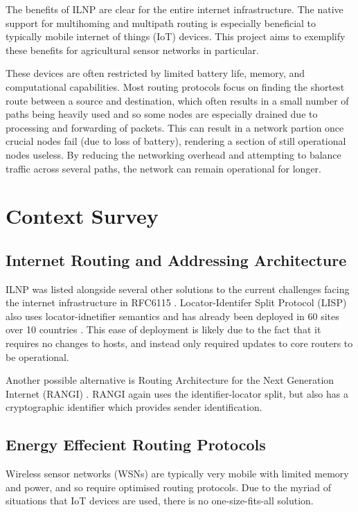 \documentclass[12pt]{article}
\begin{document}
The benefits of ILNP are clear for the entire internet infrastructure. The native support for multihoming and multipath routing is especially beneficial to typically mobile internet of things (IoT) devices. This project aims to exemplify these benefits for agricultural sensor networks in particular. 

These devices are often restricted by limited battery life, memory, and computational capabilities. Most routing protocols focus on finding the shortest route between a source and destination, which often results in a small number of paths being heavily used and so some nodes are especially drained due to processing and forwarding of packets. This can result in a network partion once crucial nodes fail (due to loss of battery), rendering a section of still operational nodes useless. By reducing the networking overhead and attempting to balance traffic across several paths, the network can remain operational for longer. 

\section{Context Survey}

\subsection{Internet Routing and Addressing Architecture}

ILNP was listed alongside several other solutions to the current challenges facing the internet infrastructure in RFC6115 \cite{rfc6115}. Locator-Identifer Split Protocol (LISP) also uses locator-idnetifier semantics and has already been deployed in 60 sites over 10 countries \cite{nahla}. This ease of deployment is likely due to the fact that it requires no changes to hosts, and instead only required updates to core routers to be operational. 

Another possible alternative is Routing Architecture for the Next Generation Internet (RANGI) \cite{rangi}. RANGI again uses the identifier-locator split, but also has a cryptographic identifier which provides sender identification. 

\subsection{Energy Effecient Routing Protocols}

Wireless sensor networks (WSNs) are typically very mobile with limited memory and power, and so require optimised routing protocols. Due to the myriad of situations that IoT devices are used, there is no one-size-fits-all solution. 
\end{document}
